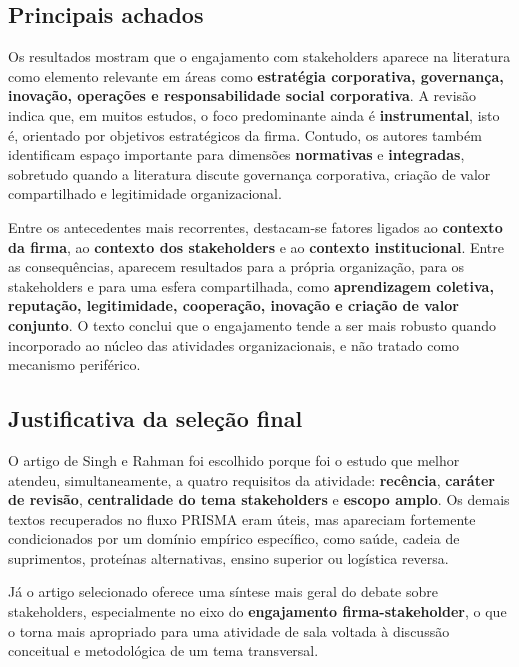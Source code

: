 \documentclass[12pt]{article}
\begin{document}
\subsection{Principais achados}
\label{sec:orgd1460cd}

Os resultados mostram que o engajamento com stakeholders aparece na literatura como elemento relevante em áreas como \textbf{estratégia corporativa, governança, inovação, operações e responsabilidade social corporativa}. A revisão indica que, em muitos estudos, o foco predominante ainda é \textbf{instrumental}, isto é, orientado por objetivos estratégicos da firma. Contudo, os autores também identificam espaço importante para dimensões \textbf{normativas} e \textbf{integradas}, sobretudo quando a literatura discute governança corporativa, criação de valor compartilhado e legitimidade organizacional.

Entre os antecedentes mais recorrentes, destacam-se fatores ligados ao \textbf{contexto da firma}, ao \textbf{contexto dos stakeholders} e ao \textbf{contexto institucional}. Entre as consequências, aparecem resultados para a própria organização, para os stakeholders e para uma esfera compartilhada, como \textbf{aprendizagem coletiva, reputação, legitimidade, cooperação, inovação e criação de valor conjunto}. O texto conclui que o engajamento tende a ser mais robusto quando incorporado ao núcleo das atividades organizacionais, e não tratado como mecanismo periférico.

\subsection{Justificativa da seleção final}
\label{sec:org950c39b}

O artigo de Singh e Rahman foi escolhido porque foi o estudo que melhor atendeu, simultaneamente, a quatro requisitos da atividade: \textbf{recência}, \textbf{caráter de revisão}, \textbf{centralidade do tema stakeholders} e \textbf{escopo amplo}. Os demais textos recuperados no fluxo PRISMA eram úteis, mas apareciam fortemente condicionados por um domínio empírico específico, como saúde, cadeia de suprimentos, proteínas alternativas, ensino superior ou logística reversa.

Já o artigo selecionado oferece uma síntese mais geral do debate sobre stakeholders, especialmente no eixo do \textbf{engajamento firma-stakeholder}, o que o torna mais apropriado para uma atividade de sala voltada à discussão conceitual e metodológica de um tema transversal.
\end{document}
